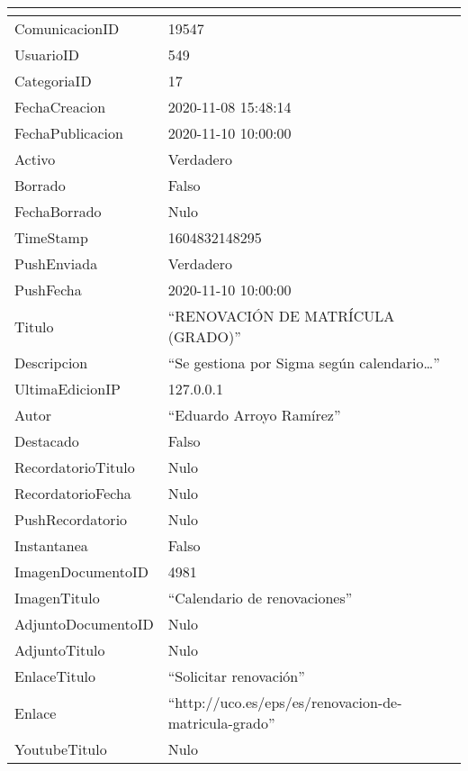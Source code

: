\begin{table}[h!]
    \centering
    \begin{tabular}{|ll|}
        \hline
        \rowcolor[HTML]{9B9B9B} 
        \multicolumn{1}{|c}{\cellcolor[HTML]{9B9B9B}{\color[HTML]{FFFFFF} Atributo}} & \multicolumn{1}{c|}{\cellcolor[HTML]{9B9B9B}{\color[HTML]{FFFFFF} Valor}} \\ \hline
        ComunicacionID & 19547 \\
        UsuarioID & 549 \\
        CategoriaID & 17 \\
        FechaCreacion & 2020-11-08 15:48:14 \\
        FechaPublicacion & 2020-11-10 10:00:00 \\
        Activo & Verdadero \\
        Borrado & Falso \\
        FechaBorrado & Nulo \\
        TimeStamp & 1604832148295 \\
        PushEnviada & Verdadero \\
        PushFecha & 2020-11-10 10:00:00 \\
        Titulo & ``RENOVACIÓN DE MATRÍCULA (GRADO)'' \\
        Descripcion & ``Se gestiona por Sigma según calendario\dots'' \\
        UltimaEdicionIP & 127.0.0.1 \\
        Autor & ``Eduardo Arroyo Ramírez'' \\
        Destacado & Falso \\
        RecordatorioTitulo & Nulo \\
        RecordatorioFecha & Nulo \\
        PushRecordatorio & Nulo \\
        Instantanea & Falso \\
        ImagenDocumentoID & 4981 \\
        ImagenTitulo & ``Calendario de renovaciones'' \\
        AdjuntoDocumentoID & Nulo \\
        AdjuntoTitulo & Nulo \\
        EnlaceTitulo & ``Solicitar renovación'' \\
        Enlace & ``http://uco.es/eps/es/renovacion-de-matricula-grado'' \\
        YoutubeTitulo & Nulo \\

\end{tabular}
\end{table}
